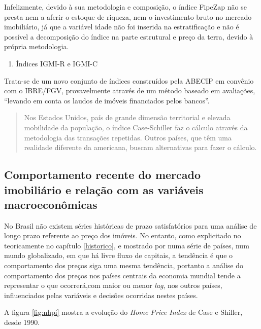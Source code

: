 \documentclass[
	12pt,				%
	oneside,			%
	a4paper,			%
	chapter=TITLE,		%
	section=TITLE,		%
	english,			%
	brazil				%
	]{abntex2}
\begin{document}
Infelizmente, devido à sua metodologia e composição, o índice FipeZap
não se presta nem a aferir o estoque de riqueza, nem o investimento
bruto no mercado imobiliário, já que a variável idade não foi inserida
na estratificação e não é possível a decomposição do índice na parte
estrutural e preço da terra, devido à própria metodologia.
\begin{enumerate}
\def\labelenumi{\alph{enumi}.}
\setcounter{enumi}{1}
\tightlist
\item
  Índices IGMI-R e IGMI-C
\end{enumerate}
Trata-se de um novo conjunto de índices construídos pela \gls{ABECIP} em
convênio com o \gls{IBRE}/\gls{FGV}, provavelmente através de um método
baseado em avaliações, ``levando em conta os laudos de imóveis
financiados pelos bancos''.
\begin{quote}
Nos Estados Unidos, país de grande dimensão territorial e elevada
mobilidade da população, o índice Case-Schiller faz o cálculo através da
metodologia das transações repetidas. Outros países, que têm uma
realidade diferente da americana, buscam alternativas para fazer o
cálculo.
\end{quote}
\subsection{Comportamento recente do mercado imobiliário e relação com
as variáveis
macroeconômicas}\label{comportamento-recente-do-mercado-imobiliuxe1rio-e-relauxe7uxe3o-com-as-variuxe1veis-macroeconuxf4micas}

No Brasil não existem séries históricas de prazo satisfatórios para uma
análise de longo prazo referente ao preço dos imóveis. No entanto, como
explicitado no teoricamente no capítulo \ref{historico}, e mostrado por
\textcite{ADAMS201038} numa série de países, num mundo globalizado, em
que há livre fluxo de capitais, a tendência é que o comportamento dos
preços siga uma mesma tendência, portanto a análise do comportamento dos
preços nos países centrais da economia mundial tende a representar o que
ocorrerá,com maior ou menor \emph{lag}, nos outros países, influenciados
pelas variáveis e decisões ocorridas nestes países.

A figura \ref{fig:nhpi} mostra a evolução do \emph{Home Price Index} de
Case e Shiller, desde 1990.
\end{document}
